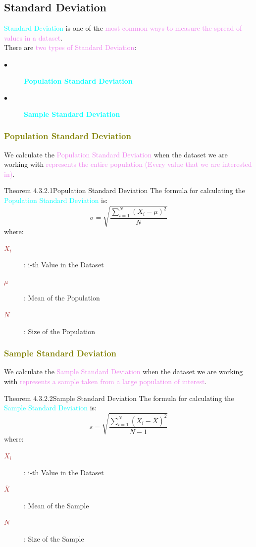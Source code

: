 \documentclass{book}
\begin{document}
\subsection{Standard Deviation}
\textcolor{cyan}{Standard Deviation} is one of the \textcolor{violet}{most common ways to measure the spread of values in a dataset}.\\
There are \textcolor{violet}{two types of Standard Deviation}:
\begin{description}
    \item[$\bullet$] \textcolor{cyan}{\textbf{Population Standard Deviation}}
    \item[$\bullet$] \textcolor{cyan}{\textbf{Sample Standard Deviation}}
\end{description}
\textcolor{olive}{\subsubsection{Population Standard Deviation}}
We calculate the \textcolor{violet}{Population Standard Deviation} when the dataset we are working with \textcolor{violet}{represents the entire population (Every value that we are interested in)}.\\
\begin{thmBox}{Theorem 4.3.2.1}{Population Standard Deviation}
    The formula for calculating the \textcolor{cyan}{Population Standard Deviation} is:
    \[
        \sigma = \sqrt{\frac{\sum_{i=1}^{N} (X_i - \mu)^2}{N}}
    \]
    where:
    \begin{description}
        \item[\textcolor{brown}{\(X_i\)}]: i-th Value in the Dataset
        \item[\textcolor{brown}{\(\mu\)}]: Mean of the Population
        \item[\textcolor{brown}{\(N\)}]: Size of the Population
    \end{description}
\end{thmBox}
\textcolor{olive}{\subsubsection{Sample Standard Deviation}}
We calculate the \textcolor{violet}{Sample Standard Deviation} when the dataset we are working with \textcolor{violet}{represents a sample taken from a large population of interest}.\\
\begin{thmBox}{Theorem 4.3.2.2}{Sample Standard Deviation}
    The formula for calculating the \textcolor{cyan}{Sample Standard Deviation} is:
    \[
        s = \sqrt{\frac{\sum_{i=1}^{N} (X_i - \bar{X})^2}{N-1}}
    \]
    where:
    \begin{description}
        \item[\textcolor{brown}{\(X_i\)}]: i-th Value in the Dataset
        \item[\textcolor{brown}{\(\bar{X}\)}]: Mean of the Sample
        \item[\textcolor{brown}{\(N\)}]: Size of the Sample
    \end{description}
\end{thmBox}
\end{document}
